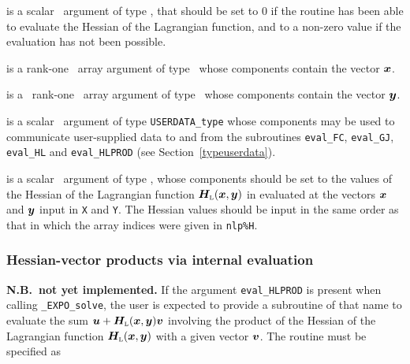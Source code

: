 \documentclass{galahad}
\newcommand{\packagename}{EXPO}
\newcommand{\fullpackagename}{\libraryname\_\packagename}
\newcommand{\solver}{{\tt \fullpackagename\_solve}}
\newcommand{\bmHL}{\bmH\sub{L}}
\begin{document}
\begin{description}
 is a scalar \intentout\ argument of type \integer,
that should be set to 0 if the routine has been able to evaluate
the Hessian of the Lagrangian function,
and to a non-zero value if the evaluation has not been possible.

 is a rank-one \intentin\ array argument of type \realdp\
whose components contain the vector ${\bm{x}}$.

 is a \ rank-one \intentin\ array argument of type
\realdp\ whose components contain the vector ${\bm{y}}$.

 is a scalar \intentinout\ argument of type
{\tt USERDATA\_type} whose components may be used
to communicate user-supplied data to and from the
subroutines {\tt eval\_FC}, {\tt eval\_GJ},
{\tt eval\_HL} and {\tt eval\_HLPROD}
(see Section~\ref{typeuserdata}).

 is a scalar \intentout\ argument of type \realdp,
whose components should be set to the values of the Hessian
of the Lagrangian function $\bmHL(\bmx,\bmy)$ in 
evaluated at the vectors ${\bm{x}}$ and ${\bm{y}}$  input in {\tt X} and {\tt Y}. 
The Hessian values should be input in the same order as that in which 
the array indices were given in {\tt nlp\%H}.


\end{description}


\subsubsection{Hessian-vector products via internal evaluation\label{hvfv}}

{\bf N.B.\ not yet implemented.}
If the argument {\tt eval\_HLPROD} is present when calling \solver, the
user is expected to provide a subroutine of that name to evaluate the
sum $\bmu + \bmHL(\bmx,\bmy) \bmv$ involving the
product of the Hessian of the Lagrangian function $\bmHL(\bmx,\bmy)$
with a given vector ${\bm{v}}$. The routine must be specified as
\end{document}
